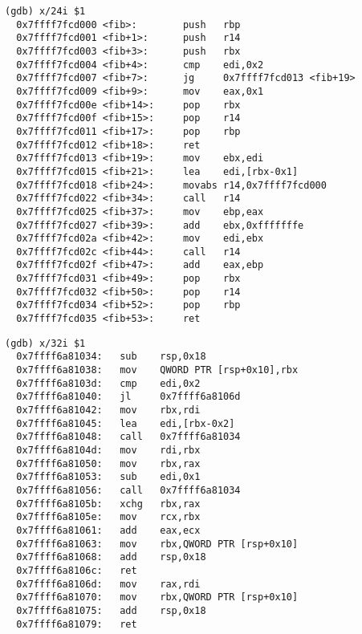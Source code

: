 \begin{lstlisting}[float,floatplacement=H,
  caption={LLVM MCJIT recursive-fib disassembly (Optimization level 3)},
  label=lst:llvm_rfib_assembly]
(gdb) x/24i $1                                                              
  0x7ffff7fcd000 <fib>:        push   rbp                                  
  0x7ffff7fcd001 <fib+1>:      push   r14                                  
  0x7ffff7fcd003 <fib+3>:      push   rbx                                  
  0x7ffff7fcd004 <fib+4>:      cmp    edi,0x2                              
  0x7ffff7fcd007 <fib+7>:      jg     0x7ffff7fcd013 <fib+19>              
  0x7ffff7fcd009 <fib+9>:      mov    eax,0x1                              
  0x7ffff7fcd00e <fib+14>:     pop    rbx                                  
  0x7ffff7fcd00f <fib+15>:     pop    r14                                  
  0x7ffff7fcd011 <fib+17>:     pop    rbp                                  
  0x7ffff7fcd012 <fib+18>:     ret                                         
  0x7ffff7fcd013 <fib+19>:     mov    ebx,edi                              
  0x7ffff7fcd015 <fib+21>:     lea    edi,[rbx-0x1]                        
  0x7ffff7fcd018 <fib+24>:     movabs r14,0x7ffff7fcd000                   
  0x7ffff7fcd022 <fib+34>:     call   r14                                  
  0x7ffff7fcd025 <fib+37>:     mov    ebp,eax                              
  0x7ffff7fcd027 <fib+39>:     add    ebx,0xfffffffe                       
  0x7ffff7fcd02a <fib+42>:     mov    edi,ebx                              
  0x7ffff7fcd02c <fib+44>:     call   r14                                  
  0x7ffff7fcd02f <fib+47>:     add    eax,ebp                              
  0x7ffff7fcd031 <fib+49>:     pop    rbx                                  
  0x7ffff7fcd032 <fib+50>:     pop    r14                                  
  0x7ffff7fcd034 <fib+52>:     pop    rbp                                  
  0x7ffff7fcd035 <fib+53>:     ret    
\end{lstlisting}

\begin{lstlisting}[float,floatplacement=H,
caption={JitBuilder recursive-fib disassembly (Optimization level \textit{Warm})},
label=lst:jitbuilder_rfib_assembly]
(gdb) x/32i $1
  0x7ffff6a81034:	sub    rsp,0x18
  0x7ffff6a81038:	mov    QWORD PTR [rsp+0x10],rbx
  0x7ffff6a8103d:	cmp    edi,0x2
  0x7ffff6a81040:	jl     0x7ffff6a8106d
  0x7ffff6a81042:	mov    rbx,rdi
  0x7ffff6a81045:	lea    edi,[rbx-0x2]
  0x7ffff6a81048:	call   0x7ffff6a81034
  0x7ffff6a8104d:	mov    rdi,rbx
  0x7ffff6a81050:	mov    rbx,rax
  0x7ffff6a81053:	sub    edi,0x1
  0x7ffff6a81056:	call   0x7ffff6a81034
  0x7ffff6a8105b:	xchg   rbx,rax
  0x7ffff6a8105e:	mov    rcx,rbx
  0x7ffff6a81061:	add    eax,ecx
  0x7ffff6a81063:	mov    rbx,QWORD PTR [rsp+0x10]
  0x7ffff6a81068:	add    rsp,0x18
  0x7ffff6a8106c:	ret    
  0x7ffff6a8106d:	mov    rax,rdi
  0x7ffff6a81070:	mov    rbx,QWORD PTR [rsp+0x10]
  0x7ffff6a81075:	add    rsp,0x18
  0x7ffff6a81079:	ret   
\end{lstlisting}

